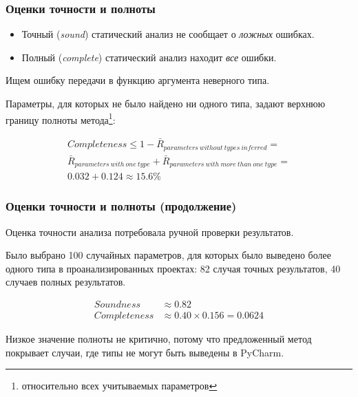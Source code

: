 \documentclass[handout]{beamer}
\begin{document}
\begin{frame}
  \frametitle{Оценки точности и полноты}

  \begin{itemize}
      \item Точный (\emph{sound}) статический анализ не сообщает о \emph{ложных} ошибках.

      \item Полный (\emph{complete}) статический анализ находит \emph{все} ошибки.
  \end{itemize}

  Ищем ошибку передачи в функцию аргумента неверного типа.

  Параметры, для которых не было найдено ни одного типа, задают верхнюю границу
  полноты метода\footnote{относительно всех учитываемых параметров}:

  \begin{multline*}
    Completeness \le 1 - \bar{R}_{parameters~without~types~inferred} = \\
    \bar{R}_{parameters~with~one~type} + \bar{R}_{parameters~with~more~than~one~type} = \\
    0.032 + 0.124 \approx 15.6\%
  \end{multline*}
    
\end{frame}

\begin{frame}
  \frametitle{Оценки точности и полноты (продолжение)}

  Оценка точности анализа потребовала ручной проверки результатов.

  Было выбрано 100 случайных параметров, для которых было выведено более одного
  типа в проанализированных проектах: 82 случая точных результатов, 40
  случаев полных результатов.


  \begin{align*}
    Soundness& \approx 0.82 \\
    Completeness& \approx 0.40 \times 0.156 = 0.0624
  \end{align*}

  Низкое значение полноты не критично, потому что предложенный метод покрывает
  случаи, где типы не могут быть выведены в PyCharm.
    
\end{frame}
\end{document}
